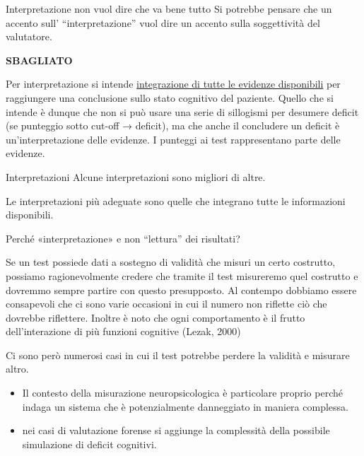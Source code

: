 \documentclass[
  ignorenonframetext,
]{beamer}
\providecommand{\tightlist}{%
  \setlength{\itemsep}{0pt}\setlength{\parskip}{0pt}}
\begin{document}
\begin{frame}{Interpretazione non vuol dire che va bene tutto}
\label{interpretazione-non-vuol-dire-che-va-bene-tutto}
Si potrebbe pensare che un accento sull' ``interpretazione'' vuol dire
un accento sulla soggettività del valutatore.

\begin{center}
\Large
\pause
\textbf{SBAGLIATO}
\end{center}
\pause
\normalsize
Per interpretazione si intende \underline{integrazione di tutte le evidenze disponibili} per raggiungere una conclusione sullo stato cognitivo del paziente.
Quello che si intende è dunque che non si può usare una serie di sillogismi per desumere deficit (se punteggio sotto cut-off → deficit), ma che anche il concludere un deficit è un'interpretazione delle evidenze. I punteggi ai test rappresentano parte delle evidenze.
\end{frame}

\begin{frame}{Interpretazioni}
\label{interpretazioni}
Alcune interpretazioni sono migliori di altre.

Le interpretazioni più adeguate sono quelle che integrano tutte le
informazioni disponibili.
\end{frame}

\begin{frame}{Perché «interpretazione» e non ``lettura'' dei risultati?}
\label{perchuxe9-interpretazione-e-non-lettura-dei-risultati}
\small

Se un test possiede dati a sostegno di validità che misuri un certo
costrutto, possiamo ragionevolmente credere che tramite il test
misureremo quel costrutto e dovremmo sempre partire con questo
presupposto. Al contempo dobbiamo essere consapevoli che ci sono varie
occasioni in cui il numero non riflette ciò che dovrebbe riflettere.
Inoltre è noto che ogni comportamento è il frutto dell'interazione di
più funzioni cognitive (Lezak, 2000)

Ci sono però numerosi casi in cui il test potrebbe perdere la validità e
misurare altro.

\begin{itemize}
\tightlist
\item
  Il contesto della misurazione neuropsicologica è particolare proprio
  perché indaga un sistema che è potenzialmente danneggiato in maniera
  complessa.\\
\item
  nei casi di valutazione forense si aggiunge la complessità della
  possibile simulazione di deficit cognitivi.
\end{itemize}
\end{frame}
\end{document}
